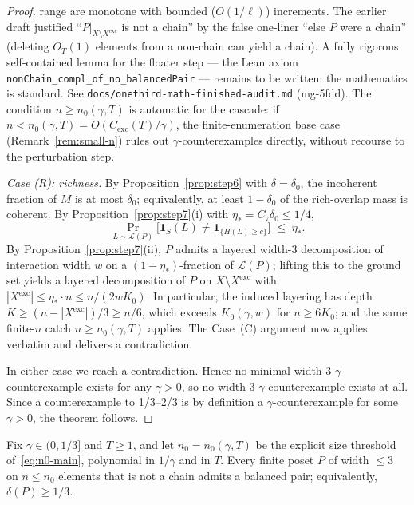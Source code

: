 \begin{proof}
{range are monotone with bounded ($O(1/\ell)$) increments. The earlier
draft justified ``$P|_{X \setminus X^{\mathrm{exc}}}$ is not a chain''
by the false one-liner ``else $P$ were a chain'' (deleting $O_T(1)$
elements from a non-chain can yield a chain). A fully rigorous
self-contained lemma for the floater step --- the Lean axiom
\texttt{nonChain\_compl\_of\_no\_balancedPair} --- remains to be
written; the mathematics is standard. See
\texttt{docs/onethird-math-finished-audit.md} (mg-5fdd).}
The condition $n \ge n_0(\gamma, T)$ is automatic for the cascade:
if $n < n_0(\gamma, T) = O(C_{\mathrm{exc}}(T)/\gamma)$, the
finite-enumeration base case (Remark~\ref{rem:small-n}) rules out
$\gamma$-counter\-examples directly, without recourse to the
perturbation step.

\medskip\noindent\emph{Case (R): richness.} By
Proposition~\ref{prop:step6} with $\delta = \delta_0$, the incoherent
fraction of $M$ is at most $\delta_0$; equivalently, at least
$1 - \delta_0$ of the rich-overlap mass is coherent. By
Proposition~\ref{prop:step7}(i) with $\eta_* = C_7 \delta_0 \le 1/4$,
\[
  \Pr_{L \sim \mathcal L(P)}\!\big[\mathbf{1}_S(L) \ne
  \mathbf{1}_{\{H(L) \ge c\}}\big] \;\le\; \eta_*.
\]
By Proposition~\ref{prop:step7}(ii), $P$ admits a layered width-$3$
decomposition of interaction width $w$ on a $(1 - \eta_*)$-fraction of
$\mathcal L(P)$; lifting this to the ground set yields a layered
decomposition of $P$ on $X \setminus X^{\mathrm{exc}}$ with
$|X^{\mathrm{exc}}| \le \eta_* \cdot n \le n / (2 w K_0)$. In
particular, the induced layering has depth
$K \ge (n - |X^{\mathrm{exc}}|)/3 \ge n/6$, which exceeds
$K_0(\gamma, w)$ for $n \ge 6 K_0$; and the same finite-$n$ catch
$n \ge n_0(\gamma, T)$ applies. The Case~(C) argument now applies
verbatim and delivers a contradiction.

\medskip
In either case we reach a contradiction. Hence no minimal width-$3$
$\gamma$-counter\-example exists for any $\gamma > 0$, so no
width-$3$ $\gamma$-counter\-example exists at all. Since a
counter\-example to 1/3--2/3 is by definition a
$\gamma$-counter\-example for some $\gamma > 0$, the theorem follows.
\end{proof}

\begin{lemma}
\label{lem:small-n}
Fix $\gamma \in (0, 1/3]$ and $T \ge 1$, and let $n_0 = n_0(\gamma, T)$
be the explicit size threshold of~\eqref{eq:n0-main}, polynomial in
$1/\gamma$ and in $T$. Every finite poset $P$ of width $\le 3$ on
$n \le n_0$ elements that is not a chain admits a balanced pair;
equivalently, $\delta(P) \ge 1/3$.
\end{lemma}

